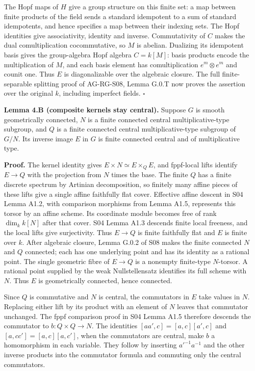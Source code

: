 \documentclass[11pt,a4paper,openany]{report}
\newcounter{none}
\begin{document}
The Hopf maps of \(H\) give a group structure on this finite set: a map between finite products of the field sends a standard idempotent to a sum of standard idempotents, and hence specifies a map between their indexing sets. The Hopf identities give associativity, identity and inverse. Commutativity of \(C\) makes the dual comultiplication cocommutative, so \(M\) is abelian. Dualizing its idempotent basis gives the group-algebra Hopf algebra \(C=k[M]\): basis products encode the multiplication of \(M\), and each basis element has comultiplication \(e^m\otimes e^m\) and counit one. Thus \(E\) is diagonalizable over the algebraic closure. The full finite-separable splitting proof of AG-RG-S08, Lemma G.0.T now proves the assertion over the original \(k\), including imperfect fields. \(\square\)

\textbf{Lemma 4.B (composite kernels stay central).} Suppose \(G\) is smooth geometrically connected, \(N\) is a finite connected central multiplicative-type subgroup, and \(Q\) is a finite connected central multiplicative-type subgroup of \(G/N\). Its inverse image \(E\) in \(G\) is finite connected central and of multiplicative type.

\textbf{Proof.} The kernel identity gives \(E\times N\simeq E\times_Q E\), and fppf-local lifts identify \(E\to Q\) with the projection from \(N\) times the base. The finite \(Q\) has a finite discrete spectrum by Artinian decomposition, so finitely many affine pieces of these lifts give a single affine faithfully flat cover. Effective affine descent in S04 Lemma A1.2, with comparison morphisms from Lemma A1.5, represents this torsor by an affine scheme. Its coordinate module becomes free of rank \(\dim_k k[N]\) after that cover. S04 Lemma A1.3 descends finite local freeness, and the local lifts give surjectivity. Thus \(E\to Q\) is finite faithfully flat and \(E\) is finite over \(k\). After algebraic closure, Lemma G.0.2 of S08 makes the finite connected \(N\) and \(Q\) connected; each has one underlying point and has its identity as a rational point. The single geometric fibre of \(E\to Q\) is a nonempty finite-type \(N\)-torsor. A rational point supplied by the weak Nullstellensatz identifies its full scheme with \(N\). Thus \(E\) is geometrically connected, hence connected.

Since \(Q\) is commutative and \(N\) is central, the commutators in \(E\) take values in \(N\). Replacing either lift by its product with an element of \(N\) leaves that commutator unchanged. The fppf comparison proof in S04 Lemma A1.5 therefore descends the commutator to \(b:Q\times Q\to N\). The identities \([aa',c]=[a,c][a',c]\) and \([a,cc']=[a,c][a,c']\), when the commutators are central, make \(b\) a homomorphism in each variable. They follow by inserting \(a'^{-1}a^{-1}\) and the other inverse products into the commutator formula and commuting only the central commutators.
\end{document}
